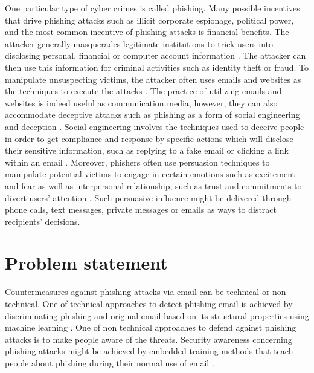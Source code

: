 One particular type of cyber crimes is called phishing. Many possible
incentives that drive phishing attacks such as illicit corporate espionage,
political power, and the most common incentive of phishing attacks
is financial benefits. The attacker generally masquerades legitimate
institutions to trick users into disclosing personal, financial or
computer account information \citep{jakobsson:2006}. The attacker
can then use this information for criminal activities such as identity
theft or fraud. To manipulate unsuspecting victims, the attacker often
uses emails and websites as the techniques to execute the attacks
\citep{jakobsson:2006}\citep{dhamija2006phishing}. The practice
of utilizing emails and websites is indeed useful as communication
media, however, they can also accommodate deceptive attacks such as
phishing as a form of social engineering and deception \citep{jakobsson:2006}\citep{blythe2011f}\citep{dhamija2006phishing}\citep{james:2005}\citep{jagatic2007social}.
Social engineering involves the techniques used to deceive people
in order to get compliance and response by specific actions which
will disclose their sensitive information, such as replying to a fake
email or clicking a link within an email \citep{mitnik:2001}. Moreover,
phishers often use persuasion techniques to manipulate potential victims
to engage in certain emotions such as excitement and fear as well
as interpersonal relationship, such as trust and commitments to divert
users' attention \citep{workman:2008}. Such persuasive influence
might be delivered through phone calls, text messages, private messages
or emails as ways to distract recipients' decisions. 

%

\section{Problem statement}

%
Countermeasures against phishing attacks via email can be technical
or non technical. One of technical approaches to detect phishing email
is achieved by discriminating phishing and original email based on
its structural properties using machine learning \citep{chandrasekaran:2006}.
One of non technical approaches to defend against phishing attacks
is to make people aware of the threats. Security awareness concerning
phishing attacks might be achieved by embedded training methods that
teach people about phishing during their normal use of email \citep{kumaraguru2007protecting}. 

